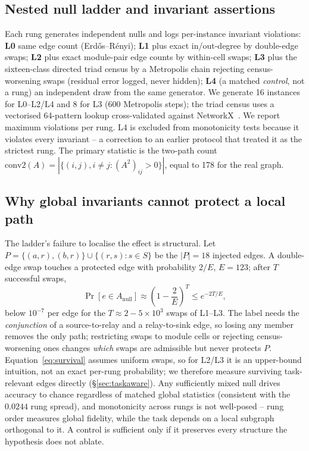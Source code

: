 \documentclass[10pt,twocolumn,letterpaper]{article}
\begin{document}
\subsection{Nested null ladder and invariant assertions}
\label{sec:ladder}

Each rung generates independent nulls and logs per-instance invariant
violations: \textbf{L0} same edge count (Erd\H{o}s--R\'enyi); \textbf{L1} plus
exact in/out-degree by double-edge swaps; \textbf{L2} plus exact module-pair
edge counts by within-cell swaps; \textbf{L3} plus the sixteen-class directed
triad census by a Metropolis chain rejecting census-worsening swaps (residual
error logged, never hidden); \textbf{L4} (a matched \emph{control}, not a
rung) an independent draw from the same generator. We generate 16 instances
for L0--L2/L4 and 8 for L3 (600 Metropolis steps); the triad census uses a
vectorised 64-pattern lookup cross-validated against
NetworkX~\cite{hagberg2008}. We report maximum violations per rung. L4 is
excluded from monotonicity tests because it violates every invariant -- a
correction to an earlier protocol that treated it as the strictest rung. The
primary statistic is the two-path count
$\mathrm{conv2}(A)=|\{(i,j),i\ne j:(A^2)_{ij}>0\}|$, equal to 178 for the
real graph.

\subsection{Why global invariants cannot protect a local path}
\label{sec:theory}

The ladder's failure to localise the effect is structural. Let
$P=\{(a,r),(b,r)\}\cup\{(r,s):s\in S\}$ be the $|P|=18$ injected edges. A
double-edge swap touches a protected edge with probability $2/E$, $E=123$;
after $T$ successful swaps,
\begin{equation}
\Pr[e\in A_{\text{null}}]\approx\left(1-\frac{2}{E}\right)^{T}\le e^{-2T/E},
\label{eq:survival}
\end{equation}
below $10^{-7}$ per edge for the $T\!\approx\!2\!-\!5\!\times\!10^{3}$ swaps
of L1--L3. The label needs the \emph{conjunction} of a source-to-relay and a
relay-to-sink edge, so losing any member removes the only path; restricting
swaps to module cells or rejecting census-worsening ones changes \emph{which}
swaps are admissible but never protects $P$. Equation~\eqref{eq:survival}
assumes uniform swaps, so for L2/L3 it is an upper-bound intuition, not an
exact per-rung probability; we therefore measure surviving task-relevant edges
directly (\S\ref{sec:taskaware}). Any sufficiently mixed null drives accuracy
to chance regardless of matched global statistics (consistent with the
$0.0244$ rung spread), and monotonicity across rungs is not well-posed -- rung
order measures global fidelity, while the task depends on a local subgraph
orthogonal to it. A control is sufficient only if it preserves every structure
the hypothesis does not ablate.
\end{document}
